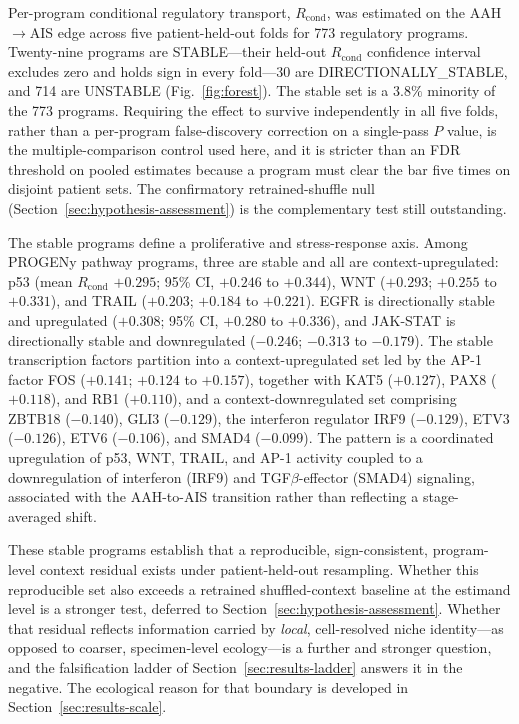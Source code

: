 Per-program conditional regulatory transport, $R_{\text{cond}}$, was estimated on the AAH$\rightarrow$AIS edge across five patient-held-out folds for 773 regulatory programs. Twenty-nine programs are STABLE---their held-out $R_{\text{cond}}$ confidence interval excludes zero and holds sign in every fold---30 are DIRECTIONALLY\_STABLE, and 714 are UNSTABLE (Fig.~\ref{fig:forest}). The stable set is a $3.8\%$ minority of the 773 programs. Requiring the effect to survive independently in all five folds, rather than a per-program false-discovery correction on a single-pass $P$ value, is the multiple-comparison control used here, and it is stricter than an FDR threshold on pooled estimates because a program must clear the bar five times on disjoint patient sets. The confirmatory retrained-shuffle null (Section~\ref{sec:hypothesis-assessment}) is the complementary test still outstanding.

The stable programs define a proliferative and stress-response axis. Among PROGENy pathway programs, three are stable and all are context-upregulated: p53 (mean $R_{\text{cond}}$ $+0.295$; 95\% CI, $+0.246$ to $+0.344$), WNT ($+0.293$; $+0.255$ to $+0.331$), and TRAIL ($+0.203$; $+0.184$ to $+0.221$). EGFR is directionally stable and upregulated ($+0.308$; 95\% CI, $+0.280$ to $+0.336$), and JAK-STAT is directionally stable and downregulated ($-0.246$; $-0.313$ to $-0.179$). The stable transcription factors partition into a context-upregulated set led by the AP-1 factor FOS ($+0.141$; $+0.124$ to $+0.157$), together with KAT5 ($+0.127$), PAX8 ($+0.118$), and RB1 ($+0.110$), and a context-downregulated set comprising ZBTB18 ($-0.140$), GLI3 ($-0.129$), the interferon regulator IRF9 ($-0.129$), ETV3 ($-0.126$), ETV6 ($-0.106$), and SMAD4 ($-0.099$). The pattern is a coordinated upregulation of p53, WNT, TRAIL, and AP-1 activity coupled to a downregulation of interferon (IRF9) and TGF$\beta$-effector (SMAD4) signaling, associated with the AAH-to-AIS transition rather than reflecting a stage-averaged shift.

These stable programs establish that a reproducible, sign-consistent, program-level context residual exists under patient-held-out resampling. Whether this reproducible set also exceeds a retrained shuffled-context baseline at the estimand level is a stronger test, deferred to Section~\ref{sec:hypothesis-assessment}. Whether that residual reflects information carried by \emph{local}, cell-resolved niche identity---as opposed to coarser, specimen-level ecology---is a further and stronger question, and the falsification ladder of Section~\ref{sec:results-ladder} answers it in the negative. The ecological reason for that boundary is developed in Section~\ref{sec:results-scale}.

